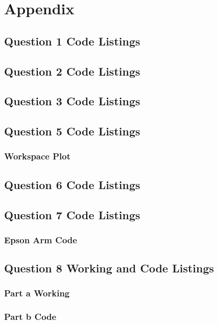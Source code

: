 \newpage
\renewcommand{\thesubsection}{\thesection.\arabic{subsection}}
\section{Appendix}
	\subsection{Question 1 Code Listings}
	
	\pagebreak
	\subsection{Question 2 Code Listings}
	
	\pagebreak
	\subsection{Question 3 Code Listings}
	
	\pagebreak
	\subsection{Question 5 Code Listings}
		\subsubsection{Workspace Plot}
		
	
	\pagebreak
	\subsection{Question 6 Code Listings}
	\pagebreak
	\subsection{Question 7 Code Listings}
			\subsubsection{Epson Arm Code}
	\pagebreak
	\subsection{Question 8 Working and Code Listings}
			\subsubsection{Part a Working}
			\pagebreak
			\subsubsection{Part b Code}